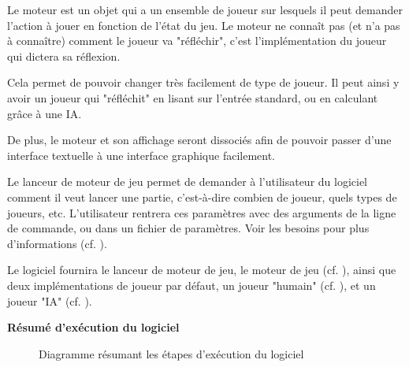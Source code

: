 Le moteur est un objet qui a un ensemble de joueur sur lesquels il peut demander l'action à jouer en fonction de l'état du jeu. Le moteur ne connaît pas (et n'a pas à connaître) comment le joueur va "réfléchir", c'est l'implémentation du joueur qui dictera sa réflexion.

Cela permet de pouvoir changer très facilement de type de joueur. Il peut ainsi y avoir un joueur qui "réfléchit" en lisant sur l'entrée standard, ou en calculant grâce à une IA.

De plus, le moteur et son affichage seront dissociés afin de pouvoir passer d'une interface textuelle à une interface graphique facilement.

\bigskip

Le lanceur de moteur de jeu permet de demander à l'utilisateur du logiciel comment il veut lancer une partie, c'est-à-dire combien de joueur, quels types de joueurs, etc. L'utilisateur rentrera ces paramètres avec des arguments de la ligne de commande, ou dans un fichier de paramètres. Voir les besoins pour plus d'informations (cf. ).

\bigskip

Le logiciel fournira le lanceur de moteur de jeu, le moteur de jeu (cf. ), ainsi que deux implémentations de joueur par défaut, un joueur "humain" (cf. ), et un joueur "IA" (cf. ).

\bigskip

\textbf{Résumé d'exécution du logiciel}

\begin{figure}[H]
    \centering
    
    
    \caption{Diagramme résumant les étapes d'exécution du logiciel}
    \label{fig:diag_exec}
\end{figure}

